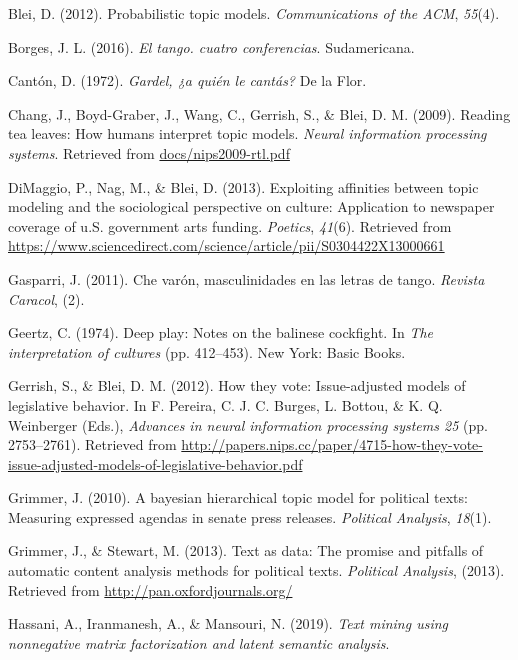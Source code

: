 \documentclass[]{article}
\begin{document}
\hypertarget{ref-blei1}{}
Blei, D. (2012). Probabilistic topic models. \emph{Communications of the
ACM}, \emph{55}(4).

\hypertarget{ref-borges}{}
Borges, J. L. (2016). \emph{El tango. cuatro conferencias}.
Sudamericana.

\hypertarget{ref-canton}{}
Cantón, D. (1972). \emph{Gardel, ¿a quién le cantás?} De la Flor.

\hypertarget{ref-chang}{}
Chang, J., Boyd-Graber, J., Wang, C., Gerrish, S., \& Blei, D. M.
(2009). Reading tea leaves: How humans interpret topic models.
\emph{Neural information processing systems}. Retrieved from
\url{docs/nips2009-rtl.pdf}

\hypertarget{ref-blei2}{}
DiMaggio, P., Nag, M., \& Blei, D. (2013). Exploiting affinities between
topic modeling and the sociological perspective on culture: Application
to newspaper coverage of u.S. government arts funding. \emph{Poetics},
\emph{41}(6). Retrieved from
\url{https://www.sciencedirect.com/science/article/pii/S0304422X13000661}

\hypertarget{ref-gasparri1}{}
Gasparri, J. (2011). Che varón, masculinidades en las letras de tango.
\emph{Revista Caracol}, (2).

\hypertarget{ref-geertz}{}
Geertz, C. (1974). Deep play: Notes on the balinese cockfight. In
\emph{The interpretation of cultures} (pp. 412--453). New York: Basic
Books.

\hypertarget{ref-blei3}{}
Gerrish, S., \& Blei, D. M. (2012). How they vote: Issue-adjusted models
of legislative behavior. In F. Pereira, C. J. C. Burges, L. Bottou, \&
K. Q. Weinberger (Eds.), \emph{Advances in neural information processing
systems 25} (pp. 2753--2761). Retrieved from
\url{http://papers.nips.cc/paper/4715-how-they-vote-issue-adjusted-models-of-legislative-behavior.pdf}

\hypertarget{ref-grimmer2}{}
Grimmer, J. (2010). A bayesian hierarchical topic model for political
texts: Measuring expressed agendas in senate press releases.
\emph{Political Analysis}, \emph{18}(1).

\hypertarget{ref-grimmer}{}
Grimmer, J., \& Stewart, M. (2013). Text as data: The promise and
pitfalls of automatic content analysis methods for political texts.
\emph{Political Analysis}, (2013). Retrieved from
\url{http://pan.oxfordjournals.org/}

\hypertarget{ref-hassani}{}
Hassani, A., Iranmanesh, A., \& Mansouri, N. (2019). \emph{Text mining
using nonnegative matrix factorization and latent semantic analysis}.
\end{document}
